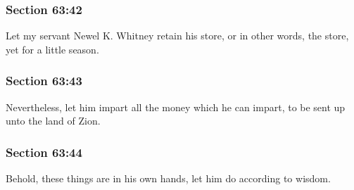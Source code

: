 
	\subsubsection{Section 63:42} %
		\label{DC63-42}

		Let my servant Newel K. Whitney retain his store, or in other words, the store, yet for a little season.


	\subsubsection{Section 63:43} %
		\label{DC63-43}

		Nevertheless, let him impart all the money which he can impart, to be sent up unto the land of Zion.


	\subsubsection{Section 63:44} %
		\label{DC63-44}

		Behold, these things are in his own hands, let him do according to wisdom.


